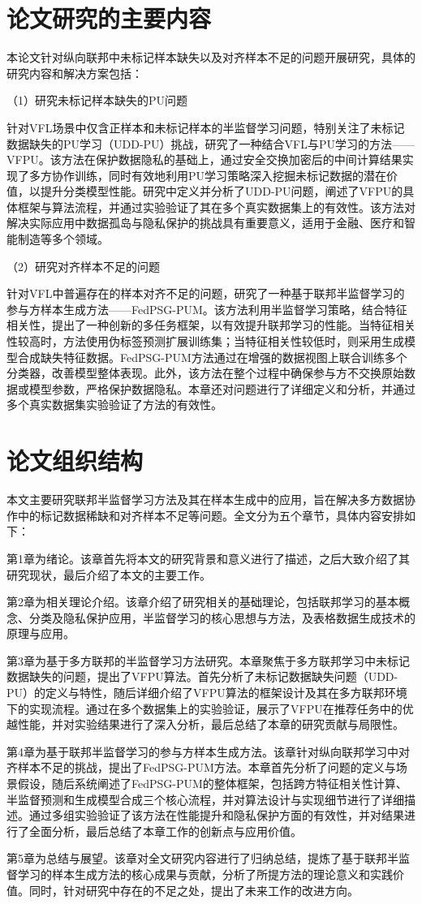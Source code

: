 \section{论文研究的主要内容}
本论文针对纵向联邦中未标记样本缺失以及对齐样本不足的问题开展研究，具体的研究内容和解决方案包括：

（1）研究未标记样本缺失的PU问题

针对VFL场景中仅含正样本和未标记样本的半监督学习问题，特别关注了未标记数据缺失的PU学习（UDD-PU）挑战，研究了一种结合VFL与PU学习的方法——VFPU。该方法在保护数据隐私的基础上，通过安全交换加密后的中间计算结果实现了多方协作训练，同时有效地利用PU学习策略深入挖掘未标记数据的潜在价值，以提升分类模型性能。研究中定义并分析了UDD-PU问题，阐述了VFPU的具体框架与算法流程，并通过实验验证了其在多个真实数据集上的有效性。该方法对解决实际应用中数据孤岛与隐私保护的挑战具有重要意义，适用于金融、医疗和智能制造等多个领域。

（2）研究对齐样本不足的问题

针对VFL中普遍存在的样本对齐不足的问题，研究了一种基于联邦半监督学习的参与方样本生成方法——FedPSG-PUM。该方法利用半监督学习策略，结合特征相关性，提出了一种创新的多任务框架，以有效提升联邦学习的性能。当特征相关性较高时，方法使用伪标签预测扩展训练集；当特征相关性较低时，则采用生成模型合成缺失特征数据。FedPSG-PUM方法通过在增强的数据视图上联合训练多个分类器，改善模型整体表现。此外，该方法在整个过程中确保参与方不交换原始数据或模型参数，严格保护数据隐私。本章还对问题进行了详细定义和分析，并通过多个真实数据集实验验证了方法的有效性。

\section{论文组织结构}
本文主要研究联邦半监督学习方法及其在样本生成中的应用，旨在解决多方数据协作中的标记数据稀缺和对齐样本不足等问题。全文分为五个章节，具体内容安排如下：


第1章为绪论。该章首先将本文的研究背景和意义进行了描述，之后大致介绍了其研究现状，最后介绍了本文的主要工作。

第2章为相关理论介绍。该章介绍了研究相关的基础理论，包括联邦学习的基本概念、分类及隐私保护应用，半监督学习的核心思想与方法，及表格数据生成技术的原理与应用。

第3章为基于多方联邦的半监督学习方法研究。本章聚焦于多方联邦学习中未标记数据缺失的问题，提出了VFPU算法。首先分析了未标记数据缺失问题（UDD-PU）的定义与特性，随后详细介绍了VFPU算法的框架设计及其在多方联邦环境下的实现流程。通过在多个数据集上的实验验证，展示了VFPU在推荐任务中的优越性能，并对实验结果进行了深入分析，最后总结了本章的研究贡献与局限性。

第4章为基于联邦半监督学习的参与方样本生成方法。该章针对纵向联邦学习中对齐样本不足的挑战，提出了FedPSG-PUM方法。本章首先分析了问题的定义与场景假设，随后系统阐述了FedPSG-PUM的整体框架，包括跨方特征相关性计算、半监督预测和生成模型合成三个核心流程，并对算法设计与实现细节进行了详细描述。通过多组实验验证了该方法在性能提升和隐私保护方面的有效性，并对结果进行了全面分析，最后总结了本章工作的创新点与应用价值。

第5章为总结与展望。该章对全文研究内容进行了归纳总结，提炼了基于联邦半监督学习的样本生成方法的核心成果与贡献，分析了所提方法的理论意义和实践价值。同时，针对研究中存在的不足之处，提出了未来工作的改进方向。
\clearpage


